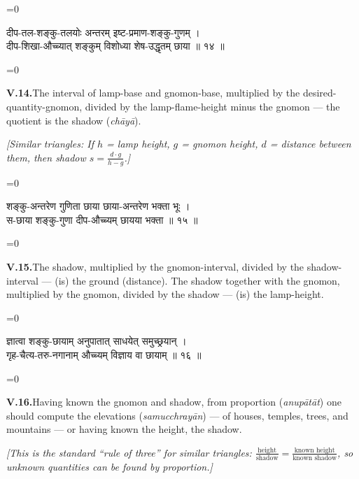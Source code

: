 \documentclass[11pt,a4paper]{article}
\newcommand{\dev}[1]{{\devanagarifont\color{sktcolor}#1}}
\newcommand{\iast}[1]{\textit{#1}}
\newenvironment{paracol}[1]{\begingroup}{\endgroup}
\newcommand{\switchcolumn}[1][]{%
  \ifnum#1=0\relax\else\par\nobreak\vspace{0.5em}\par\nobreak\fi%
}
\begin{document}
\vspace{0.3cm}

\begin{paracol}{2}
\switchcolumn[0]
\dev{%
दीप-तल-शङ्कु-तलयोः अन्तरम् इष्ट-प्रमाण-शङ्कु-गुणम् ।\\
दीप-शिखा-औच्च्यात् शङ्कुम् विशोध्या शेष-उद्धृतम् छाया ॥ १४ ॥
}

\switchcolumn[1]
\textbf{V.14.}\quad The interval of lamp-base and gnomon-base,
multiplied by the desired-quantity-gnomon, divided by the
lamp-flame-height minus the gnomon — the quotient is the shadow
(\iast{chāyā}).

\medskip
\textit{[Similar triangles: If $h$ = lamp height, $g$ = gnomon height,
$d$ = distance between them, then shadow $s = \frac{d \cdot g}{h - g}$.]}
\end{paracol}

\vspace{0.3cm}

\begin{paracol}{2}
\switchcolumn[0]
\dev{%
शङ्कु-अन्तरेण गुणिता छाया छाया-अन्तरेण भक्ता भूः ।\\
स-छाया शङ्कु-गुणा दीप-औच्च्यम् छायया भक्ता ॥ १५ ॥
}

\switchcolumn[1]
\textbf{V.15.}\quad The shadow, multiplied by the gnomon-interval,
divided by the shadow-interval — (is) the ground (distance). The
shadow together with the gnomon, multiplied by the gnomon, divided
by the shadow — (is) the lamp-height.
\end{paracol}

\vspace{0.3cm}

\begin{paracol}{2}
\switchcolumn[0]
\dev{%
ज्ञात्वा शङ्कु-छायाम् अनुपातात् साधयेत् समुच्छ्रयान् ।\\
गृह-चैत्य-तरु-नगानाम् औच्च्यम् विज्ञाय वा छायाम् ॥ १६ ॥
}

\switchcolumn[1]
\textbf{V.16.}\quad Having known the gnomon and shadow, from
proportion (\iast{anupātāt}) one should compute the elevations
(\iast{samucchrayān}) — of houses, temples, trees, and mountains
— or having known the height, the shadow.

\medskip
\textit{[This is the standard ``rule of three'' for similar triangles:
$\frac{\text{height}}{\text{shadow}} = \frac{\text{known height}}{\text{known shadow}}$,
so unknown quantities can be found by proportion.]}
\end{paracol}
\end{document}
